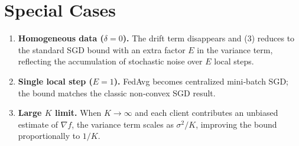 \documentclass{article}
\begin{document}
\section*{Special Cases}
\begin{enumerate}[label=\alph*.]
\item \textbf{Homogeneous data ($\delta=0$).}  
The drift term disappears and (3) reduces to the standard SGD bound with an extra factor $E$ in the variance term, reflecting the accumulation of stochastic noise over $E$ local steps.
\item \textbf{Single local step ($E=1$).}  
FedAvg becomes centralized mini‑batch SGD; the bound matches the classic non‑convex SGD result.
\item \textbf{Large $K$ limit.}  
When $K\to\infty$ and each client contributes an unbiased estimate of $\nabla f$, the variance term scales as $\sigma^2/K$, improving the bound proportionally to $1/K$.
\end{enumerate}
\end{document}
